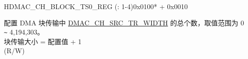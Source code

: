 \begin{register}{H}{DMAC\_CH\_BLOCK\_TS0\_REG (: 1-4)}{0x0100* + 0x0010}\label{regdesc:DMACCHNBLOCKTS0REG}
%
%
\regnewline%
\begin{regdesc}\begin{reglist}
\label{fielddesc:DMACCHNBLOCKTS}\item [DMAC\_CH\regindex{n}\_BLOCK\_TS] 配置 DMA 块传输中 \hyperref[fielddesc:DMACCHNSRCTRWIDTH]{DMAC\_CH\_SRC\_TR\_WIDTH} 的总个数，取值范围为 0 \verb+~+ 4,194,303。 \\
块传输大小 = 配置值 + 1 \\
(R/W)
\end{reglist}\end{regdesc}
\end{register}

